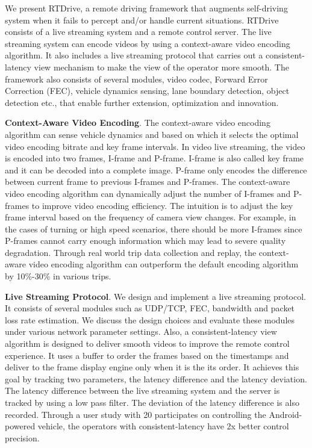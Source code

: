 We present RTDrive, a remote driving framework
that augments self-driving system when it fails to 
percept and/or handle current situations. 
RTDrive consists of a live streaming system
and a remote control server. 
The live streaming system can encode videos by using
a context-aware video encoding algorithm. 
It also includes a live streaming protocol that 
carries out a consistent-latency
view mechanism to make the view of the operator
more smooth. 
The framework also consists of several modules, video codec, 
Forward Error Correction (FEC), vehicle dynamics sensing,
lane boundary detection, object detection etc.,
that enable further extension, optimization and innovation.  



\textbf{Context-Aware Video Encoding}.
The context-aware video encoding algorithm can 
sense vehicle dynamics and based on which it 
selects the optimal video encoding bitrate and key frame intervals. 
In video live streaming, the video is encoded into two
frames, I-frame and P-frame.
I-frame is also called key frame and it can be 
decoded into a complete image. 
P-frame only encodes the difference between current
frame to previous I-frames and P-frames. 
The context-aware video encoding algorithm
can dynamically adjust the number of I-frames
and P-frames to improve video encoding efficiency. 
The intuition is to adjust the key frame interval 
based on the frequency of camera view changes. 
For example, in the cases of turning or high speed scenarios,
there should be more I-frames since P-frames cannot
carry enough information which may lead to severe quality degradation. 
Through real world trip data collection and replay,
the context-aware video encoding algorithm can outperform
the default encoding algorithm by 10\%-30\% in various trips. 

\textbf{Live Streaming Protocol}.
We design and implement a live streaming protocol. 
It consists of several modules such as UDP/TCP, FEC, 
bandwidth and packet loss rate estimation. 
We discuss the design choices and evaluate these modules
under various network parameter settings. 
Also, a consistent-latency view algorithm 
is designed to deliver smooth
videos to improve the remote control experience. 
It uses a buffer to order the frames based on the timestamps
and deliver to the frame display engine only when it is 
the its order.
It achieves this goal by tracking two parameters, 
the latency difference and the latency deviation.   
The latency difference between
the live streaming system and the server is
tracked by using a low pass filter. 
The deviation of the latency difference is also recorded. 
Through a user study with 20 participates on controlling the Android-powered
vehicle, the operators with consistent-latency have
2x better control precision. 

